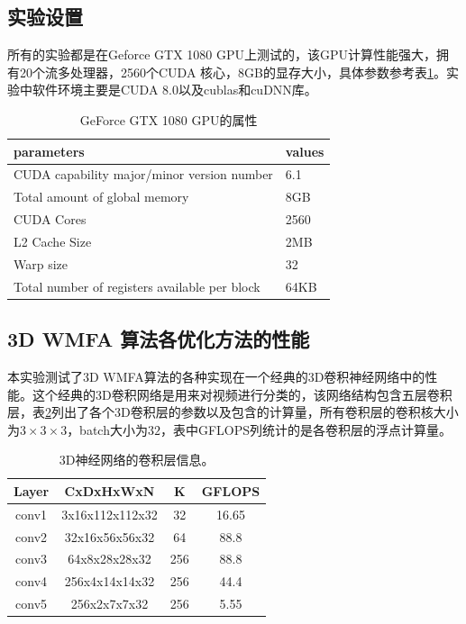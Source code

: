 \subsection{实验设置}
所有的实验都是在Geforce GTX 1080 GPU上测试的，该GPU计算性能强大，拥有20个流多处理器，2560个CUDA 核心，8GB的显存大小，具体参数参考表\ref{my-label}。实验中软件环境主要是CUDA 8.0以及cublas和cuDNN库。
\begin{table}[]
\centering
\caption{GeForce GTX 1080 GPU的属性}
\label{my-label}
\begin{tabular}{l|l}
\hline
parameters                                    & values \\ \hline
CUDA capability major/minor version number    & 6.1    \\ \hline
Total amount of global memory                 & 8GB    \\ \hline
CUDA Cores                                    & 2560   \\ \hline
L2 Cache Size                                 & 2MB    \\ \hline
Warp size                                     & 32     \\ \hline
Total number of registers available per block & 64KB   \\ \hline
\end{tabular}
\end{table}


\subsection{3D WMFA 算法各优化方法的性能}
本实验测试了3D WMFA算法的各种实现在一个经典的3D卷积神经网络中的性能。这个经典的3D卷积网络是用来对视频进行分类的，该网络结构包含五层卷积层，表\ref{conv3d-info}列出了各个3D卷积层的参数以及包含的计算量，所有卷积层的卷积核大小为$3\times 3\times 3$，batch大小为$32$，表中GFLOPS列统计的是各卷积层的浮点计算量。
\begin{table}[]
\centering
\caption{3D神经网络的卷积层信息。}
\label{conv3d-info}
\begin{tabular}{|c|c|c|c|}
\hline
Layer & CxDxHxWxN       & K   & GFLOPS \\ \hline
conv1 & 3x16x112x112x32 & 32  & 16.65   \\ \hline
conv2 & 32x16x56x56x32  & 64  & 88.8  \\ \hline
conv3 & 64x8x28x28x32   & 256 & 88.8  \\ \hline
conv4 & 256x4x14x14x32  & 256 & 44.4   \\ \hline
conv5 & 256x2x7x7x32    & 256 & 5.55   \\ \hline
\end{tabular}
\end{table} 

